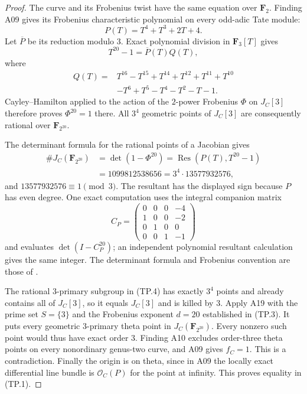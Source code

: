 \documentclass[11pt,a4paper]{article}
\begin{document}
\begin{proof}
The curve and its Frobenius twist have the same equation over
$\mathbf F_2$. Finding A09 gives its Frobenius characteristic
polynomial on every odd-adic Tate module:
\[
                         P(T)=T^4+T^3+2T+4.
 \tag{TP.2}
\]
Let $\overline P$ be its reduction modulo $3$. Exact polynomial
division in $\mathbf F_3[T]$ gives
\[
                       T^{20}-1=\overline P(T)Q(T),
 \tag{TP.3}
\]
where
\[
\begin{aligned}
 Q(T)={}&T^{16}-T^{15}+T^{14}+T^{12}+T^{11}+T^{10}\\
        &-T^6+T^5-T^4-T^2-T-1.
\end{aligned}
\]
Cayley--Hamilton applied to the action of the $2$-power Frobenius
$\Phi$ on $J_C[3]$ therefore proves $\Phi^{20}=1$ there.
All $3^4$ geometric points of $J_C[3]$ are consequently rational
over $\mathbf F_{2^{20}}$.

The determinant formula for the rational points of a Jacobian
gives
\[
\begin{aligned}
 \#J_C(\mathbf F_{2^{20}})
   &=\det(1-\Phi^{20})
     =\operatorname{Res}(P(T),T^{20}-1)\\
   &=1099812538656
     =3^4\cdot13577932576,
\end{aligned}
 \tag{TP.4}
\]
and $13577932576\equiv1\pmod3$.
The resultant has the displayed sign because $P$ has even degree.
One exact computation uses the integral companion matrix
\[
 C_P=\begin{pmatrix}
 0&0&0&-4\\
 1&0&0&-2\\
 0&1&0&0\\
 0&0&1&-1
 \end{pmatrix}
\]
and evaluates $\det(I-C_P^{20})$; an independent polynomial
resultant calculation gives the same integer.
The determinant formula and Frobenius convention are those of
\cite[Theorem~19.1(b), pp.~40--41]{MilneAV}.

The rational $3$-primary subgroup in (TP.4) has exactly $3^4$
points and already contains all of $J_C[3]$, so it equals
$J_C[3]$ and is killed by $3$.
Apply A19 with the prime set $S=\{3\}$ and the Frobenius exponent
$d=20$ established in (TP.3). It puts every geometric
$3$-primary theta point in $J_C(\mathbf F_{2^{20}})$.
Every nonzero such point would thus have exact order $3$.
Finding A10 excludes order-three theta points on every nonordinary
genus-two curve, and A09 gives $f_C=1$. This is a contradiction.
Finally the origin is on theta, since in A09 the locally exact
differential line bundle is $\mathcal O_C(P)$ for the point at
infinity. This proves equality in (TP.1).
\end{proof}
\end{document}
